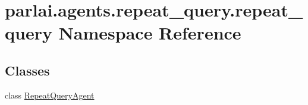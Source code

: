 \hypertarget{namespaceparlai_1_1agents_1_1repeat__query_1_1repeat__query}{}\section{parlai.\+agents.\+repeat\+\_\+query.\+repeat\+\_\+query Namespace Reference}
\label{namespaceparlai_1_1agents_1_1repeat__query_1_1repeat__query}
\subsection*{Classes}
\begin{DoxyCompactItemize}
\item 
class \hyperlink{classparlai_1_1agents_1_1repeat__query_1_1repeat__query_1_1RepeatQueryAgent}{Repeat\+Query\+Agent}
\end{DoxyCompactItemize}
